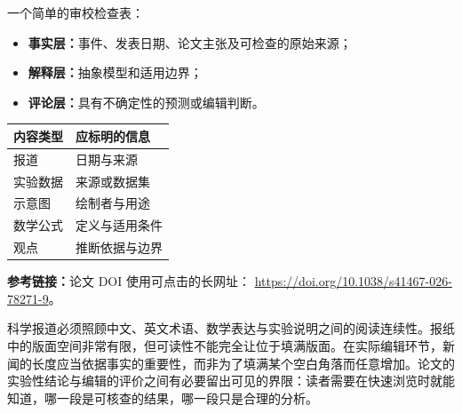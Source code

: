\documentclass[10pt]{article}
\begin{document}
\begin{documents}
{一个简单的审校检查表：
\begin{itemize}
\item \textbf{事实层：}事件、发表日期、论文主张及可检查的原始来源；
\item \textbf{解释层：}抽象模型和适用边界；
\item \textbf{评论层：}具有不确定性的预测或编辑判断。
\end{itemize}

\begin{center}
\begin{tabular}{@{}ll@{}}
\toprule
内容类型 & 应标明的信息\\
\midrule
报道 & 日期与来源\\
实验数据 & 来源或数据集\\
示意图 & 绘制者与用途\\
数学公式 & 定义与适用条件\\
观点 & 推断依据与边界\\
\bottomrule
\end{tabular}
\end{center}

\textbf{参考链接：}论文 DOI 使用可点击的长网址：
\url{https://doi.org/10.1038/s41467-026-78271-9}。

科学报道必须照顾中文、英文术语、数学表达与实验说明之间的阅读连续性。报纸中的版面空间非常有限，但可读性不能完全让位于填满版面。在实际编辑环节，新闻的长度应当依据事实的重要性，而非为了填满某个空白角落而任意增加。论文的实验性结论与编辑的评价之间有必要留出可见的界限：读者需要在快速浏览时就能知道，哪一段是可核查的结果，哪一段只是合理的分析。
}


\end{documents}


\end{document}
